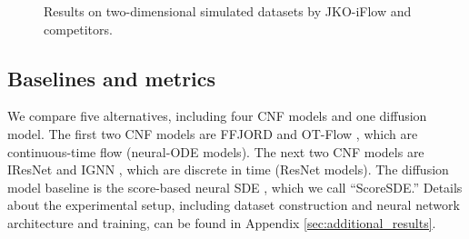 \documentclass{article}
\theoremstyle{remark}
\theoremstyle{plain}
\newcommand{\JKO}{JKO-iFlow}
\begin{document}
{\begin{figure}[!t]
\begin{minipage}{0.30\textwidth}
        \label{img3}
    \end{minipage}
     \vspace{-5pt}
    \caption{
    Results on two-dimensional simulated datasets  by \JKO{} and competitors. }
    \label{fig_rose_full_data}
\end{figure}
\begin{table}[!b]
    \centering
    \caption{
    Inversion error 
    $\mathbb{E}_{x\sim p_X }\|{T_{\theta}^{-1}}({T_{\theta}}(x))-x\|^2_2$ of \JKO{}
    computed via sample average on the test split of the data set,
    where $T_{\theta}$ denotes the transport mapping over all the blocks of the trained flow network.
    }\label{inv_err}
\end{table}


\subsection{Baselines and metrics}


We compare five alternatives, 
including four CNF  models and one diffusion model. 
%
The first two CNF models are 
FFJORD \citep{FFJORD} and OT-Flow \citep{OT-Flow}, which are continuous-time flow (neural-ODE models).
%
The next two CNF models are 
IResNet \citep{iResnet} and IGNN \citep{xu2022invertible}, 
which are discrete in time (ResNet models). 
%
The diffusion model baseline is the score-based neural SDE \citep{song2021score}, which we call ``ScoreSDE.''
Details about the experimental setup, including dataset construction and neural network architecture and training,  can be found in Appendix \ref{sec:additional_results}.



}
\end{document}

